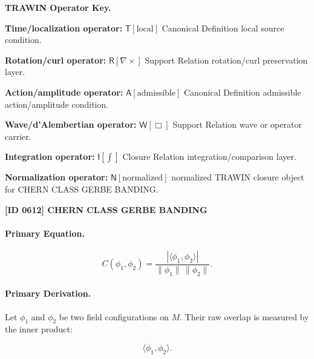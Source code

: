 \par\vspace{0.45\baselineskip}
\noindent\begin{minipage}[t]{\linewidth}
\begingroup
\small
\raggedright
\textbf{TRAWIN Operator Key.}\par
\noindent\textbf{Time/localization operator:} $\mathsf{T}\!\left[\mathrm{local}\right]$ Canonical Definition local source condition.\par
\noindent\textbf{Rotation/curl operator:} $\mathsf{R}\!\left[\nabla\times\right]$ Support Relation rotation/curl preservation layer.\par
\noindent\textbf{Action/amplitude operator:} $\mathsf{A}\!\left[\mathrm{admissible}\right]$ Canonical Definition admissible action/amplitude condition.\par
\noindent\textbf{Wave/d'Alembertian operator:} $\mathsf{W}\!\left[\Box\right]$ Support Relation wave or operator carrier.\par
\noindent\textbf{Integration operator:} $\mathsf{I}\!\left[\int\right]$ Closure Relation integration/comparison layer.\par
\noindent\textbf{Normalization operator:} $\mathsf{N}\!\left[\mathrm{normalized}\right]$ normalized TRAWIN closure object for CHERN CLASS GERBE BANDING.\par
\endgroup
\end{minipage}

\clearpage
\noindent\textbf{[ID 0612] CHERN CLASS GERBE BANDING}\par
\vspace{0.35em}
\paragraph{Primary Equation.}
\begin{equation}
C(\phi_1,\phi_2)
=
\frac{
\left|\langle \phi_1,\phi_2\rangle\right|
}{
\lVert \phi_1\rVert\,\lVert \phi_2\rVert
}.
\end{equation}

\paragraph{Primary Derivation.}
Let $\phi_1$ and $\phi_2$ be two field configurations on $M$.  
Their raw overlap is measured by the inner product:

\begin{equation}
\langle \phi_1,\phi_2\rangle .
\end{equation}

